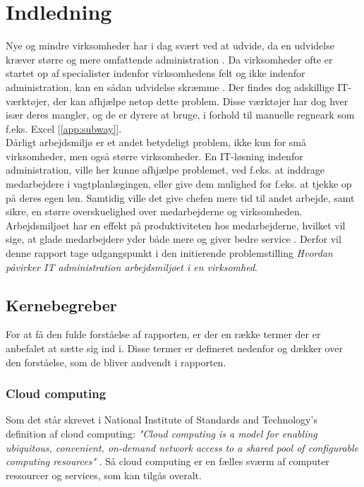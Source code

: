 \chapter{Indledning}
Nye og mindre virksomheder har i dag svært ved at udvide, da en udvidelse kræver større og mere omfattende administration \citep{SmaaFirmaerOrker}. Da virksomheder ofte er startet op af specialister indenfor virksomhedens felt og ikke indenfor administration, kan en sådan udvidelse skræmme \citep{SmaaFirmaerOrker}. Der findes dog adskillige IT-værktøjer, der kan afhjælpe netop dette problem. Disse værktøjer har dog hver især deres mangler, og de er dyrere at bruge, i forhold til manuelle regneark som f.eks. Excel [\ref{app:subway}].\\
Dårligt arbejdsmiljø er et andet betydeligt problem, ikke kun for små virksomheder, men også større virksomheder. En IT-løsning indenfor administration, ville her kunne afhjælpe problemet, ved f.eks. at inddrage medarbejdere i vagtplanlægingen, eller give dem mulighed for f.eks. at tjekke op på deres egen løn. Samtidig ville det give chefen mere tid til andet arbejde, samt sikre, en større overskuelighed over medarbejderne og virksomheden. 
Arbejdsmiljøet har en effekt på produktiviteten hos medarbejderne, hvilket vil sige, at glade medarbejdere yder både mere og giver bedre service \citep{Jensen2014}. Derfor vil denne rapport tage udgangspunkt i den initierende problemstilling \textit{Hvordan påvirker IT administration arbejdsmiljøet i en virksomhed}.

\section{Kernebegreber}
For at få den fulde forståelse af rapporten, er der en række termer der er anbefalet at sætte sig ind i. Disse termer er defineret nedenfor og dækker over den forståelse, som de bliver andvendt i rapporten. 
\subsection{Cloud computing}
Som det står skrevet i  National Institute
of Standards and Technology’s definition af cloud computing: \textit{"Cloud computing is a model for enabling ubiquitous, convenient, on-demand network access to a shared pool of configurable computing resources"} \citep{cloud_def}. Så cloud computing er en fælles sværm af computer ressourcer og services, som kan tilgås overalt.

